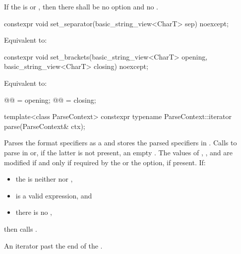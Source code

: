 If the  is  or ,
then there shall be
no  option and no .

%
\begin{itemdecl}
constexpr void set_separator(basic_string_view<CharT> sep) noexcept;
\end{itemdecl}

\begin{itemdescr}
\pnum
\effects
Equivalent to: 
\end{itemdescr}

%
\begin{itemdecl}
constexpr void set_brackets(basic_string_view<CharT> opening,
                            basic_string_view<CharT> closing) noexcept;
\end{itemdecl}

\begin{itemdescr}
\pnum
\effects
Equivalent to:
\begin{codeblock}
@@ = opening;
@@ = closing;
\end{codeblock}
\end{itemdescr}

%
\begin{itemdecl}
template<class ParseContext>
  constexpr typename ParseContext::iterator
    parse(ParseContext& ctx);
\end{itemdecl}

\begin{itemdescr}
\pnum
\effects
Parses the format specifiers as a  and
stores the parsed specifiers in .
Calls  to parse
 in  or,
if the latter is not present, an empty .
The values of
, , and 
are modified if and only if required by
the  or the  option, if present.
If:
\begin{itemize}
\item
the  is neither  nor ,
\item
{} is a valid expression, and
\item
there is no ,
\end{itemize}
then calls .

\pnum
\returns
An iterator past the end of the .
\end{itemdescr}

